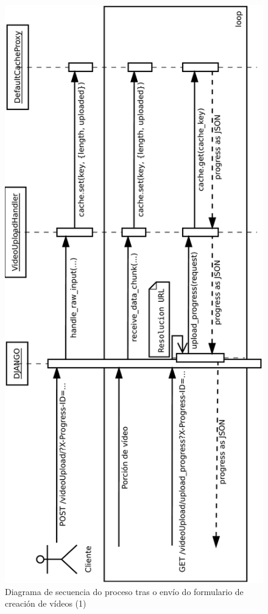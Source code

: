         \begin{figure}[htp]
        \begin{center}
            \includegraphics[scale=0.45]{figures/SubidaVideo.pdf}
            \caption{Diagrama de secuencia do proceso tras o envío do formulario 
            de creación de vídeos (1)}
        \label{fig:SubidaVideo1}
        \end{center}
        \end{figure}
        
